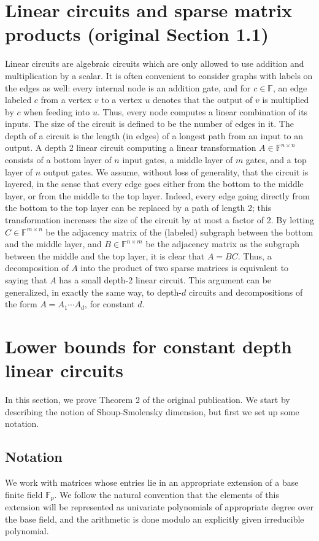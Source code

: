 \documentclass[10pt,a4paper]{article}
\newcommand{\F}{\mathbb F}
\begin{document}
\section*{Linear circuits and sparse matrix products (original Section 1.1)}
Linear circuits are algebraic circuits which are only allowed to use addition and multiplication by a scalar. It is often convenient to consider graphs with labels on the edges as well: every internal node is an addition gate, and for $c\in\F$, an edge labeled $c$ from a vertex $v$ to a vertex $u$ denotes that the output of $v$ is multiplied by $c$ when feeding into $u$. Thus, every node computes a linear combination of its inputs. The size of the circuit is defined to be the number of edges in it. The depth of a circuit is the length (in edges) of a longest path from an input to an output.
A depth 2 linear circuit computing a linear transformation $A\in\F^{n\times n}$ consists of a bottom layer of $n$ input gates, a middle layer of $m$ gates, and a top layer of $n$ output gates. We assume, without loss of generality, that the circuit is layered, in the sense that every edge goes either from the bottom to the middle layer, or from the middle to the top layer. Indeed, every edge going directly from the bottom to the top layer can be replaced by a path of length 2; this transformation increases the size of the circuit by at most a factor of 2.
By letting $C\in\F^{m\times n}$ be the adjacency matrix of the (labeled) subgraph between the bottom and the middle layer, and $B\in\F^{n\times m}$ be the adjacency matrix as the subgraph between the middle and the top layer, it is clear that $A=BC$. Thus, a decomposition of $A$ into the product of two sparse matrices is equivalent to saying that $A$ has a small depth-2 linear circuit. This argument can be generalized, in exactly the same way, to depth-$d$ circuits and decompositions of the form $A=A_1\cdots A_d$, for constant $d$.

\setcounter{section}{1}
\setcounter{theorem}{7}
\section{Lower bounds for constant depth linear circuits}\label{sec:shoup-smol based lb}
In this section, we prove Theorem 2 of the original publication. 
We start by describing  the notion of Shoup-Smolensky dimension, but first we set up some notation.

\subsection{Notation}
 We work with matrices whose entries lie in an appropriate extension of a base finite field $\F_p$. We follow the natural convention that the elements of this extension will be represented as univariate polynomials of appropriate degree over the base field, and the arithmetic is done modulo an explicitly given irreducible polynomial. 
\end{document}
